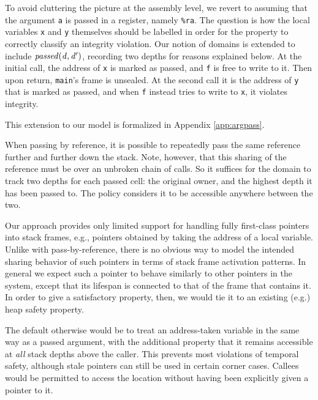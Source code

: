 \documentclass[10pt,conference]{ieeetran}%
\theoremstyle{definition}
\begin{document}
{To avoid cluttering the picture at the assembly level, we revert to assuming that the
argument {\tt a} is passed in a register, namely {\tt \%ra}.
The question is how the local variables {\tt x} and {\tt y} themselves
should be labelled in order for the property to correctly classify an integrity violation.
Our notion of domains is extended to include \(\mathit{passed(d,d')}\),
recording two depths for reasons explained below.
At the initial call, the address of {\tt x} is marked as passed, and {\tt f} is free to write to it. Then upon
return, {\tt main}'s frame is unsealed. At the second call it is the address of {\tt y} that is marked as passed,
and when {\tt f} instead tries to write to {\tt x}, it violates integrity.

This extension to our model is formalized in Appendix \ref{app:argpass}.

When passing by reference, it is possible to repeatedly pass the same reference further
and further down the stack. Note, however, that this sharing of the reference must be over
an unbroken chain of calls. So it suffices for the domain to track two depths for each passed
cell: the original owner, and the highest depth it has been passed to. The policy considers
it to be accessible anywhere between the two.

Our approach provides only limited support for handling fully first-class pointers into
stack frames, e.g., pointers obtained by taking the address of a local variable.
Unlike with pass-by-reference, there is no obvious way to model the intended
sharing behavior of such pointers in terms of stack frame activation patterns.
In general we expect such a pointer to behave similarly to other pointers in
the system, except that its lifespan is connected to that of the frame that contains
it. In order to give a satisfactory property, then, we would tie it to an existing (e.g.)
heap safety property.

The default otherwise would be to treat an address-taken variable in the
same way as a passed argument, with the additional property
that it remains accessible at \emph{all} stack depths above the caller.
This prevents most violations of temporal safety, although stale pointers
can still be used in certain corner cases. Callees would be permitted
to access the location without having been explicitly given a pointer
to it.

}
\end{document}
